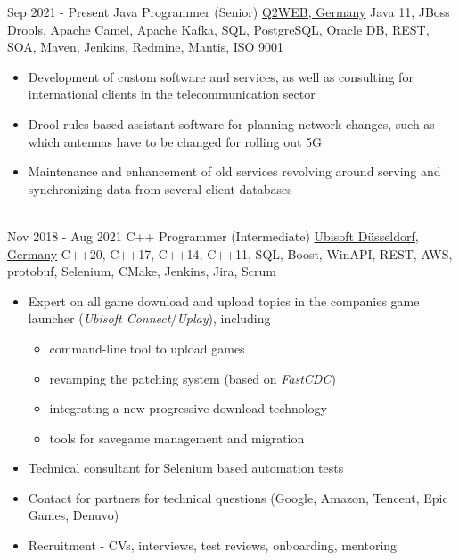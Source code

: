 \documentclass[letterpaper]{twentysecondcv} %
\begin{document}
\begin{twenty} %
     	\twentyitem
    		{Sep 2021 -}
		{Present}
        		{Java Programmer (Senior)}
        		{\href{https://www.q2web.de/}{Q2WEB, Germany}}
        		{Java 11, JBoss Drools, Apache Camel, Apache Kafka, SQL, PostgreSQL, Oracle DB, REST, SOA, Maven, Jenkins, Redmine, Mantis, ISO 9001}
        		{\begin{itemize}
        			\item Development of custom software and services, as well as consulting for international clients in the telecommunication sector
        			\item Drool-rules based assistant software for planning network changes, such as which antennas have to
        			be changed for rolling out 5G
        			\item Maintenance and enhancement of old services revolving around serving and synchronizing data from several client databases
        		\end{itemize}}\\
     	\twentyitem
    		{Nov 2018 -}
		{Aug 2021}
        		{C++ Programmer (Intermediate)}
        		{\href{https://duesseldorf.ubisoft.com/en}{Ubisoft Düsseldorf, Germany}}
        		{C++20, C++17, C++14, C++11, SQL, Boost, WinAPI, REST, AWS, protobuf, Selenium, CMake, Jenkins, Jira, Scrum}
        		{\begin{itemize}
        			\item Expert on all game download and upload topics in the companies game launcher (\textit{Ubisoft Connect}/\textit{Uplay}), including
        			\begin{itemize}
        				\item command-line tool to upload games
        				\item revamping the patching system (based on \textit{FastCDC})
        				\item integrating a new progressive download technology
        				\item tools for savegame management and migration
        			\end{itemize}
        			\item Technical consultant for Selenium based automation tests
        			\item Contact for partners for technical questions (Google, Amazon, Tencent, Epic Games, Denuvo)
        			\item Recruitment - CVs, interviews, test reviews, onboarding, mentoring

\end{itemize}}
\end{twenty}
\end{document}

